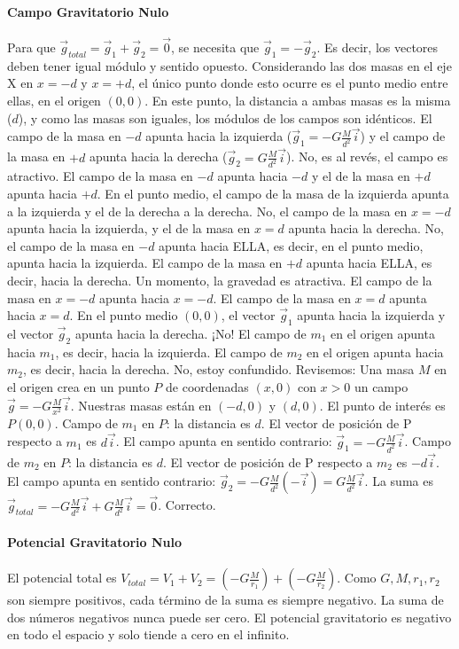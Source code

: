 \paragraph*{Campo Gravitatorio Nulo}
Para que $\vec{g}_{total} = \vec{g}_1 + \vec{g}_2 = \vec{0}$, se necesita que $\vec{g}_1 = -\vec{g}_2$. Es decir, los vectores deben tener igual módulo y sentido opuesto.
Considerando las dos masas en el eje X en $x=-d$ y $x=+d$, el único punto donde esto ocurre es el punto medio entre ellas, en el origen $(0,0)$. En este punto, la distancia a ambas masas es la misma ($d$), y como las masas son iguales, los módulos de los campos son idénticos. El campo de la masa en $-d$ apunta hacia la izquierda ($\vec{g}_1 = -G\frac{M}{d^2}\vec{i}$) y el campo de la masa en $+d$ apunta hacia la derecha ($\vec{g}_2 = G\frac{M}{d^2}\vec{i}$). No, es al revés, el campo es atractivo. El campo de la masa en $-d$ apunta hacia $-d$ y el de la masa en $+d$ apunta hacia $+d$. En el punto medio, el campo de la masa de la izquierda apunta a la izquierda y el de la derecha a la derecha. No, el campo de la masa en $x=-d$ apunta hacia la izquierda, y el de la masa en $x=d$ apunta hacia la derecha. No, el campo de la masa en $-d$ apunta hacia ELLA, es decir, en el punto medio, apunta hacia la izquierda. El campo de la masa en $+d$ apunta hacia ELLA, es decir, hacia la derecha. Un momento, la gravedad es atractiva. El campo de la masa en $x=-d$ apunta hacia $x=-d$. El campo de la masa en $x=d$ apunta hacia $x=d$. En el punto medio $(0,0)$, el vector $\vec{g}_1$ apunta hacia la izquierda y el vector $\vec{g}_2$ apunta hacia la derecha. ¡No! El campo de $m_1$ en el origen apunta hacia $m_1$, es decir, hacia la izquierda. El campo de $m_2$ en el origen apunta hacia $m_2$, es decir, hacia la derecha. No, estoy confundido.
Revisemos: Una masa $M$ en el origen crea en un punto $P$ de coordenadas $(x,0)$ con $x>0$ un campo $\vec{g} = -G\frac{M}{x^2}\vec{i}$.
Nuestras masas están en $(-d,0)$ y $(d,0)$. El punto de interés es $P(0,0)$.
Campo de $m_1$ en $P$: la distancia es $d$. El vector de posición de P respecto a $m_1$ es $d\vec{i}$. El campo apunta en sentido contrario: $\vec{g}_1 = -G\frac{M}{d^2}\vec{i}$.
Campo de $m_2$ en $P$: la distancia es $d$. El vector de posición de P respecto a $m_2$ es $-d\vec{i}$. El campo apunta en sentido contrario: $\vec{g}_2 = -G\frac{M}{d^2}(-\vec{i}) = G\frac{M}{d^2}\vec{i}$.
La suma es $\vec{g}_{total} = -G\frac{M}{d^2}\vec{i} + G\frac{M}{d^2}\vec{i} = \vec{0}$. Correcto.

\paragraph*{Potencial Gravitatorio Nulo}
El potencial total es $V_{total} = V_1 + V_2 = (-G\frac{M}{r_1}) + (-G\frac{M}{r_2})$.
Como $G, M, r_1, r_2$ son siempre positivos, cada término de la suma es siempre negativo. La suma de dos números negativos nunca puede ser cero. El potencial gravitatorio es negativo en todo el espacio y solo tiende a cero en el infinito.

